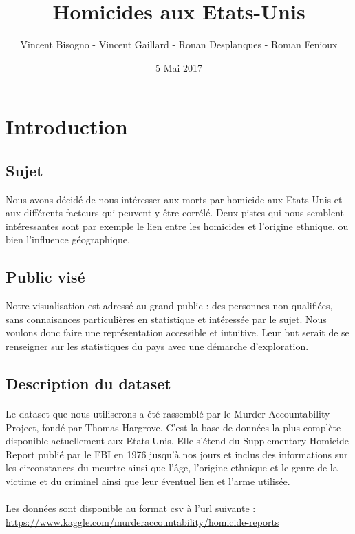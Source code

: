 \documentclass[a4paper,10pt]{report}
\title{Homicides aux Etats-Unis}
\author{Vincent Bisogno - Vincent Gaillard - Ronan Desplanques - Roman Fenioux}
\date{5 Mai 2017}
\begin{document}
\maketitle

\setcounter{secnumdepth}{0}

\section{Introduction}
\subsection{Sujet}
Nous avons décidé de nous intéresser aux morts par homicide aux Etats-Unis et aux différents facteurs qui peuvent y être corrélé. Deux
pistes qui nous semblent intéressantes sont par exemple le lien entre les homicides et l'origine ethnique, ou bien l'influence géographique.

\subsection{Public visé}
Notre visualisation est adressé au grand public : des personnes non qualifiées, sans connaisances particulières en statistique et intéressée
par le sujet. Nous voulons donc faire une représentation accessible et intuitive. Leur but serait de se renseigner sur les statistiques du pays
avec une démarche d'exploration.

\subsection{Description du dataset}
\paragraph{}
Le dataset que nous utiliserons a été rassemblé par le Murder Accountability Project, fondé par Thomas Hargrove. C'est la base de données
la plus complète disponible actuellement aux Etats-Unis. Elle s'étend du Supplementary Homicide Report 
publié par le FBI en 1976 jusqu'à nos jours
et inclus des informations sur les circonstances du meurtre ainsi que l'âge, l'origine ethnique 
et le genre de la victime et du criminel ainsi que
leur éventuel lien et l'arme utilisée. 

\paragraph{}
Les données sont disponible au format csv à l'url suivante : \\
\url{https://www.kaggle.com/murderaccountability/homicide-reports}
\end{document}
